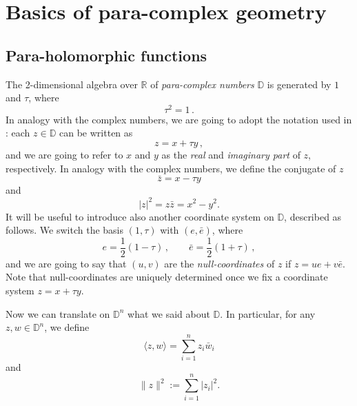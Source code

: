 \documentclass[11pt, reqno]{amsart}
\newcommand{\D}{\mathds{D}}
\newcommand{\R}{\mathds{R}}
\begin{document}
\section{Basics of para-complex geometry}\label{basics}
\subsection{Para-holomorphic  functions}
 

The 2-dimensional algebra over $\R$ of \emph{para-complex numbers} $\D$ is generated by $1$ and $\tau$, where 
$$\tau^2=1\,.
$$
In  analogy with the complex numbers, we are going to adopt the notation used in \cite{hl}: each $z\in\D$ can be written as 
$$
z=x+\tau y\,,
$$
and we are going to refer to $x$ and $y$ as the \emph{real} and \emph{imaginary part} of $z$, respectively.
In analogy with the complex numbers, we define the conjugate of $z$
$$ \bar z=x-\tau y$$
and 
$$|z|^2=z\bar z=x^2-y^2.$$
It will be useful to introduce also another coordinate system on $\D$, described as follows. We switch the basis $(1,\tau)$ with $(e,\bar e)$, where
$$
e=\frac{1}{2}\left(1-\tau\right)\,,\qquad \bar e=\frac{1}{2}\left(1+\tau\right)\,,
$$
and we are going to say that $(u,v)$ are the \emph{null-coordinates} of $z$ if  $z=ue+v\bar e$. Note that null-coordinates are uniquely determined once we fix a coordinate system $z=x+\tau y$.


Now we can translate on $\D^n$  what we said about $\D$. In particular, for any $z,w\in\D^n$, we define 
$$\langle z, w\rangle= \sum_{i=1}^n z_i\bar w_i$$
and
$$\|z\|^2:=\sum_{i=1}^n |z_i|^2.$$
\end{document}
